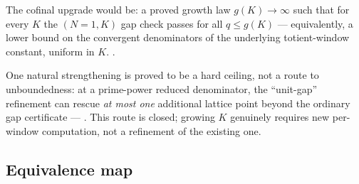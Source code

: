 The cofinal
upgrade would be: a proved growth law $g(K)\to\infty$ such that for every
$K$ the $(N{=}1,K)$ gap check passes for all $q\le g(K)$ — equivalently, a
lower bound on the convergent denominators of the underlying totient-window
constant, uniform in $K$.   .

One
natural strengthening is proved to be a hard ceiling, not a route to
unboundedness: at a prime-power reduced denominator, the ``unit-gap''
refinement can rescue \emph{at most one} additional lattice point beyond
the ordinary gap certificate —
\quad {}. This route is closed; growing $K$ genuinely requires new
per-window computation, not a refinement of the existing one.

\subsection{Equivalence map}

